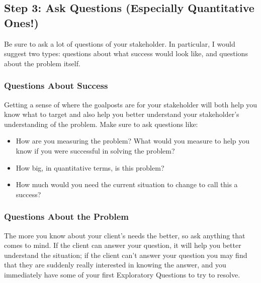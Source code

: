 \documentclass[letterpaper,10pt,english]{jupyterBook}
\begin{document}
\subsection{Step 3: Ask Questions (Especially Quantitative Ones!)}
\label{\detokenize{10_introduction/30_solving_the_right_problem:step-3-ask-questions-especially-quantitative-ones}}
\sphinxAtStartPar
Be sure to ask a lot of questions of your stakeholder. In particular, I would suggest two types: questions about what success would look like, and questions about the problem itself.


\subsubsection{Questions About Success}
\label{\detokenize{10_introduction/30_solving_the_right_problem:questions-about-success}}
\sphinxAtStartPar
Getting a sense of where the goalposts are for your stakeholder will both help you know what to target and also help you better understand your stakeholder’s understanding of the problem. Make sure to ask questions like:
\begin{itemize}
\item {} 
\sphinxAtStartPar
How are you measuring the problem? What would you measure to help you know if you were successful in solving the problem?

\item {} 
\sphinxAtStartPar
How big, in quantitative terms, is this problem?

\item {} 
\sphinxAtStartPar
How much would you need the current situation to change to call this a success?

\end{itemize}


\subsubsection{Questions About the Problem}
\label{\detokenize{10_introduction/30_solving_the_right_problem:questions-about-the-problem}}
\sphinxAtStartPar
The more you know about your client’s needs the better, so ask anything that comes to mind. If the client can answer your question, it will help you better understand the situation; if the client can’t answer your question you may find that they are suddenly really interested in knowing the answer, and you immediately have some of your first Exploratory Questions to try to resolve.
\end{document}
